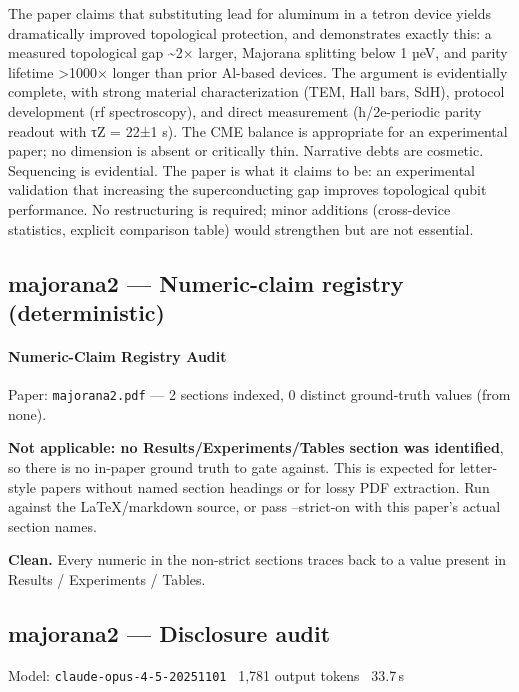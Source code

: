 \documentclass[10pt,letterpaper]{article}
\begin{document}
The paper claims that substituting lead for aluminum in a tetron device yields dramatically improved topological protection, and demonstrates exactly this: a measured topological gap \textasciitilde2× larger, Majorana splitting below 1 µeV, and parity lifetime \textgreater1000× longer than prior Al-based devices. The argument is evidentially complete, with strong material characterization (TEM, Hall bars, SdH), protocol development (rf spectroscopy), and direct measurement (h/2e-periodic parity readout with τZ = 22±1 s). The CME balance is appropriate for an experimental paper; no dimension is absent or critically thin. Narrative debts are cosmetic. Sequencing is evidential. The paper is what it claims to be: an experimental validation that increasing the superconducting gap improves topological qubit performance. No restructuring is required; minor additions (cross-device statistics, explicit comparison table) would strengthen but are not essential.


\subsection{majorana2 --- Numeric-claim registry (deterministic)}
\hypertarget{numeric-claim-registry-audit}{%
\paragraph{Numeric-Claim Registry Audit}\label{numeric-claim-registry-audit}}

Paper: \texttt{majorana2.pdf} --- 2 sections indexed, 0 distinct ground-truth values (from none).

\textbf{Not applicable: no Results/Experiments/Tables section was identified}, so there is no in-paper ground truth to gate against. This is expected for letter-style papers without named section headings or for lossy PDF extraction. Run against the LaTeX/markdown source, or pass --strict-on with this paper's actual section names.

\textbf{Clean.} Every numeric in the non-strict sections traces back to a value present in Results / Experiments / Tables.


\subsection{majorana2 --- Disclosure audit}
\noindent\textcolor{muted}{\small Model: \texttt{claude-opus-4-5-20251101} \textperiodcentered\ 1,781 output tokens \textperiodcentered\ 33.7\,s}
\end{document}
